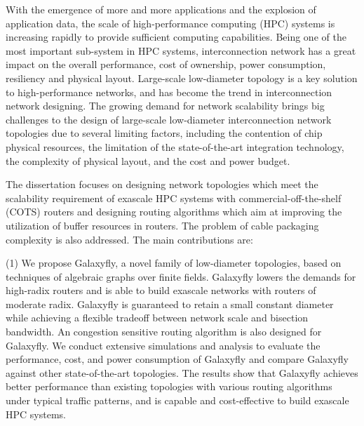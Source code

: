 \begin{eabstract}
  With the emergence of more and more applications
  and the explosion of application data,
  the scale of high-performance computing (HPC) systems is increasing rapidly
  to provide sufficient computing capabilities.
  Being one of the most important sub-system in HPC systems,
  interconnection network has a great impact on the overall performance,
  cost of ownership, power consumption, resiliency and physical layout.
  Large-scale low-diameter topology is a key solution to high-performance networks,
  and has become the trend in interconnection network designing.
  The growing demand for network scalability brings
  big challenges to the design of large-scale low-diameter
  interconnection network topologies due to several limiting factors,
  including the contention of chip physical resources,
  the limitation of the state-of-the-art integration technology,
  the complexity of physical layout, and the cost and power budget.

  The dissertation focuses on designing network topologies
  which meet the scalability requirement of exascale HPC systems
  with commercial-off-the-shelf (COTS) routers
  and designing routing algorithms which aim at improving
  the utilization of buffer resources in routers.
  The problem of cable packaging complexity is also addressed.
  The main contributions are:

  (1)
  We propose Galaxyfly, a novel family of low-diameter topologies,
  based on techniques of algebraic graphs over finite fields.
  Galaxyfly lowers the demands for high-radix routers
  and is able to build exascale networks with routers of moderate radix.
  Galaxyfly is guaranteed to retain a small constant diameter
  while achieving a flexible tradeoff between network scale
  and bisection bandwidth.
  An congestion sensitive routing algorithm is also designed for Galaxyfly.
  We conduct extensive simulations and
  analysis to evaluate the performance, cost,
  and power consumption of Galaxyfly and compare Galaxyfly
  against other state-of-the-art topologies.
  The results show that Galaxyfly achieves better performance
  than existing topologies with various routing algorithms under typical traffic patterns,
  and is capable and cost-effective to build exascale HPC systems.


\end{eabstract}
